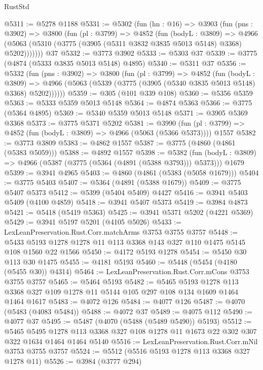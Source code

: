 \begin{lexlean}{RustStd}
\begin{coremodule}
@5311 := @5278 @1188
@5331 := @5302
    (fun (hn : @16) =>
    @3903
      (fun (pns : @3902) =>
      @3800
        (fun (pl : @3799) =>
        @4852
          (fun (bodyL : @3809) =>
          @4966 (@5063 (@5310 (@3775 (@3905 (@5311 @3832 @3835 @5013 @5148) @3368) @5202)))))))
    @37
@5332 := @3773 @3902
@5333 := @5303 @37
@5339 := @3775 (@4874 (@5333 @3835 @5013 @5148) @4895)
@5340 := @5311 @37
@5356 := @5332
    (fun (pns : @3902) =>
    @3800
      (fun (pl : @3799) =>
      @4852
        (fun (bodyL : @3809) =>
        @4966 (@5063 (@5339 (@3775 (@3905 (@5340 @3835 @5013 @5148) @3368) @5202))))))
@5359 := @305 (@101 @339 @108)
@5360 := @5356 @5359
@5363 := @5333 @5359 @5013 @5148
@5364 := @4874 @5363
@5366 := @3775 (@5364 @4895)
@5369 := @5340 @5359 @5013 @5148
@5371 := @3905 @5369 @3368
@5373 := @3775 @5371 @5202
@5381 := @3990
    (fun (pl : @3799) => @4852 (fun (bodyL : @3809) => @4966 (@5063 (@5366 @5373))))
    @1557
@5382 := @3773 @3809
@5383 := @4862 @1557
@5387 := @3775 (@4860 (@4861 (@5383 @5059)))
@5388 := @4892 @1557
@5398 := @5382
    (fun (bodyL : @3809) => @4966 (@5387 (@3775 (@5364 (@4891 (@5388 @3793))) @5373)))
    @1679
@5399 := @3941 @4965
@5403 := @4860 (@4861 (@5383 (@5058 @1679)))
@5404 := @3775 @5403
@5407 := @5364 (@4891 (@5388 @1679))
@5409 := @3775 @5407 @5373
@5412 := @5399 (@5404 @5409) @4427
@5416 := @3941 @5403 @5409 (@4100 @4859)
@5418 := @3941 @5407 @5373
@5419 := @3984 @4873
@5421 := @5418 (@5419 @5363)
@5425 := @3941 @5371 @5202 (@4221 @5369)
@5429 := @3941 @5197 @5201 (@4105 @5026)
@5433 := LexLeanPreservation.Rust.Corr.matchArms @3753 @3755 @3757
@5448 := @5433 @5193 @1278 @1278 @11 @113 @3368 @143 @327 @110 @1475 @5145 @108 @1560 @22 @1566
@5450 := @4172 @5193 @1278
@5454 := @5450 @30 @113 @30 @1475
@5455 := @4181 @5193
@5460 := @5448 (@5454 (@4180 (@5455 @30)) @4314)
@5464 := LexLeanPreservation.Rust.Corr.mCons @3753 @3755 @3757
@5465 := @5464 @5193
@5482 := @5465
    @5193
    @1278
    @113
    @3368
    @327
    @109
    @1278
    @11
    @5144
    @105
    @297
    @108
    @134
    @1609
    @1464
    @1464
    @1617
@5483 := @4072 @126
@5484 := @4077 @126
@5487 := @4070 (@5483 (@4083 @5484))
@5488 := @4072 @37
@5489 := @4075 @112
@5490 := @4077 @37
@5495 := @5487 (@4070 (@5488 (@5489 @5490)) @5193)
@5512 := @5465
    @5495
    @1278
    @113
    @3368
    @327
    @108
    @1278
    @11
    @1673
    @22
    @302
    @307
    @322
    @1634
    @1464
    @1464
    @5140
@5516 := LexLeanPreservation.Rust.Corr.mNil @3753 @3755 @3757
@5524 := @5512 (@5516 @5193 @1278 @113 @3368 @327 @1278 @11)
@5526 := @3984 (@3777 @294)

\end{coremodule}
\end{lexlean}

